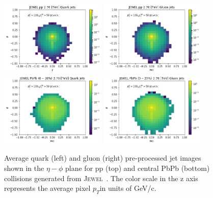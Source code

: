 \documentclass[notoc]{JHEP3}
\newcommand{\pt}{$p_{T}$}
\newcommand{\jw}{\textsc{Jewel}~}
\begin{document}
\begin{figure}[t]
\centering
\includegraphics[width=0.45\textwidth]{plots/jewel_pp_avgQuarkJet}
\includegraphics[width=0.45\textwidth]{plots/jewel_pp_avgGluonJet}
\includegraphics[width=0.45\textwidth]{plots/jewel_pbpb020_avgQuarkJet}
\includegraphics[width=0.45\textwidth]{plots/jewel_pbpb020_avgGluonJet}
\caption{Average quark (left) and gluon (right) pre-processed jet images shown in the $\eta-\phi$ plane for pp (top) and central PbPb (bottom) collisions generated from \jw. The color scale in the z axis represents the average pixel \pt in units of GeV/c. }
\label{fig:qgjetimages}
\end{figure}
\end{document}
